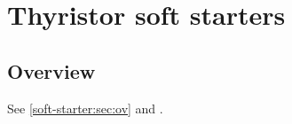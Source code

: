 \chapter{Thyristor soft starters}
\label{ch:soft-starter}

\renewcommand{\dif}{\mathrm{d}x}
\section{Overview}\label{soft-starter:sec:ov}
See \autoref{soft-starter:sec:ov} and \cite{baliga}.

\renewcommand{\dif}{\mathrm{d}}
